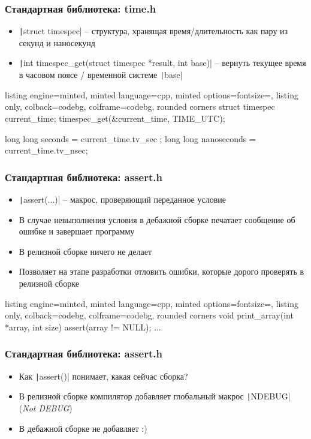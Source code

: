 \documentclass[10pt]{beamer}
\begin{document}
\begin{frame}[fragile]
\frametitle{Стандартная библиотека: time.h}
\begin{itemize}
\item \texttt|struct timespec| -- структура, хранящая время/длительность как пару из секунд и наносекунд
\pause
\item \texttt|int timespec_get(struct timespec *result, int base)| -- вернуть текущее время в часовом поясе / временной системе \texttt|base|
\end{itemize}
\pause
{}
\begin{tcblisting}{listing engine=minted, minted language=cpp, minted options={fontsize=\scriptsize}, listing only, colback=codebg, colframe=codebg, rounded corners}
struct timespec current_time;
timespec_get(&current_time, TIME_UTC);

long long seconds     = current_time.tv_sec ;
long long nanoseconds = current_time.tv_nsec;
\end{tcblisting}
\end{frame}

\begin{frame}[fragile]
\frametitle{Стандартная библиотека: assert.h}
\begin{itemize}
\item \texttt|assert(...)| -- макрос, проверяющий переданное условие
\pause
\item В случае невыполнения условия в дебажной сборке печатает сообщение об ошибке и завершает программу
\pause
\item В релизной сборке ничего не делает
\pause
\item Позволяет на этапе разработки отловить ошибки, которые дорого проверять в релизной сборке
\end{itemize}
\pause
{}
\begin{tcblisting}{listing engine=minted, minted language=cpp, minted options={fontsize=\scriptsize}, listing only, colback=codebg, colframe=codebg, rounded corners}
void print_array(int *array, int size) {
  assert(array != NULL);
  ...
}
\end{tcblisting}
\end{frame}

\begin{frame}[fragile]
\frametitle{Стандартная библиотека: assert.h}
\begin{itemize}
\item Как \texttt|assert()| понимает, какая сейчас сборка?
\pause
\item В релизной сборке компилятор добавляет глобальный макрос \texttt|NDEBUG| (\textit{Not DEBUG})
\pause
\item В дебажной сборке не добавляет :)
\end{itemize}
\end{frame}
\end{document}
